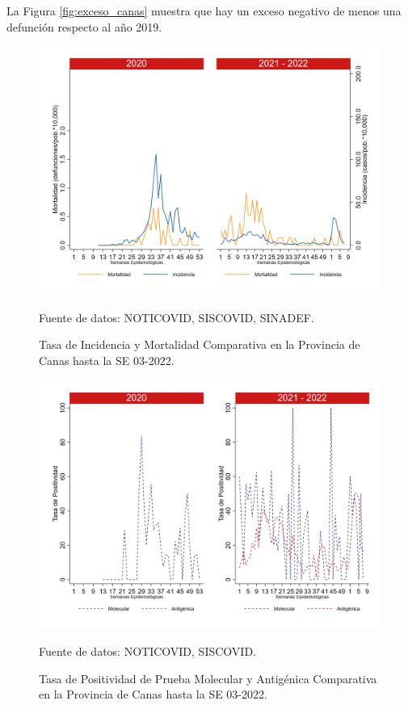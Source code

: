 \documentclass[12pt,a4paper,openany]{book}
\begin{document}
		La Figura \ref{fig:exceso_canas} muestra que hay un exceso negativo de menos una defunción respecto al año 2019.
		
		\begin{figure}[h]
			\caption{Tasa de Incidencia y Mortalidad Comparativa en la Provincia de Canas hasta la SE 03-2022.}\label{fig:inc_mort_canas}
			\begin{center}
				\includegraphics[width=0.7\linewidth]{../figuras/incidencia_mortalidad_20_21_3.png}
			\end{center}
			{\footnotesize {Fuente de datos: NOTICOVID, SISCOVID, SINADEF.}}
		\end{figure}
		
		\begin{figure}[h]
			\caption{Tasa de Positividad de Prueba Molecular y Antigénica Comparativa en la Provincia de Canas hasta la SE 03-2022.}\label{fig:positividad_canas}
			\begin{center}
				\includegraphics[width=0.7\linewidth]{../figuras/positividad_20_21_3.png}
			\end{center}
			{\footnotesize {Fuente de datos: NOTICOVID, SISCOVID.}}
		\end{figure}
		
\end{document}
